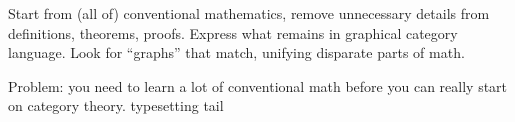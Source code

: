 \documentclass[11pt,openany]{book}
\def \texFolder {../../tex/}
\begin{document}
Start from (all of) conventional mathematics,
remove unnecessary details from definitions, theorems, proofs.
Express what remains in graphical category language.
Look for ``graphs'' that match, unifying disparate parts of math.

Problem: you need to learn a lot of conventional math before
you can really start on category theory.
\vfill
\glsaddallunused
\appendix
\setcounter{currentlevel}{\value{baseSectionLevel}}
{typesetting}
\setcounter{currentlevel}{\value{baseSectionLevel}}
{tail}
\end{document}
